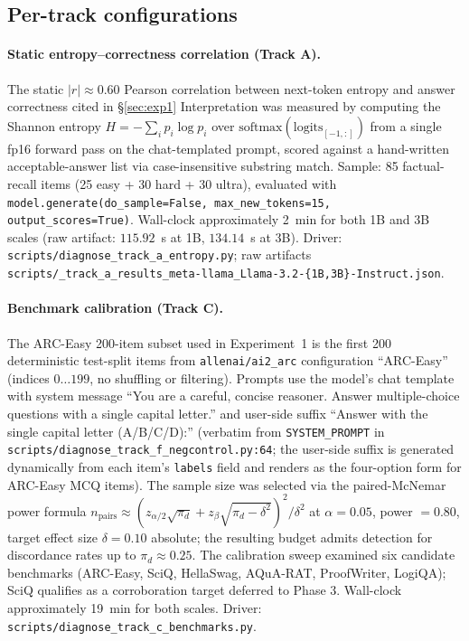 \documentclass{article}
\begin{document}
\subsection{Per-track configurations}

\paragraph{Static entropy--correctness correlation (Track A).}
The static $|r| \approx 0.60$ Pearson correlation between next-token entropy and answer correctness cited in §\ref{sec:exp1} Interpretation was measured by computing the Shannon entropy $H = -\sum_i p_i \log p_i$ over $\mathrm{softmax}(\mathrm{logits}_{[-1, :]})$ from a single fp16 forward pass on the chat-templated prompt, scored against a hand-written acceptable-answer list via case-insensitive substring match. Sample: 85 factual-recall items (25 easy + 30 hard + 30 ultra), evaluated with \texttt{model.generate(do\_sample=False, max\_new\_tokens=15, output\_scores=True)}. Wall-clock approximately 2~min for both 1B and 3B scales (raw artifact: $115.92$~s at 1B, $134.14$~s at 3B). Driver: \texttt{scripts/diagnose\_track\_a\_entropy.py}; raw artifacts \texttt{scripts/\_track\_a\_results\_meta-llama\_Llama-3.2-\{1B,3B\}-Instruct.json}.

\paragraph{Benchmark calibration (Track C).}
The ARC-Easy 200-item subset used in Experiment~1 is the first 200 deterministic test-split items from \texttt{allenai/ai2\_arc} configuration ``ARC-Easy'' (indices $0\ldots199$, no shuffling or filtering). Prompts use the model's chat template with system message ``You are a careful, concise reasoner. Answer multiple-choice questions with a single capital letter.'' and user-side suffix ``Answer with the single capital letter (A/B/C/D):'' (verbatim from \texttt{SYSTEM\_PROMPT} in \texttt{scripts/diagnose\_track\_f\_negcontrol.py:64}; the user-side suffix is generated dynamically from each item's \texttt{labels} field and renders as the four-option form for ARC-Easy MCQ items). The sample size was selected via the paired-McNemar power formula $n_{\text{pairs}} \approx (z_{\alpha/2}\sqrt{\pi_d} + z_\beta \sqrt{\pi_d - \delta^2})^2 / \delta^2$ at $\alpha = 0.05$, power $= 0.80$, target effect size $\delta = 0.10$ absolute; the resulting budget admits detection for discordance rates up to $\pi_d \approx 0.25$. The calibration sweep examined six candidate benchmarks (ARC-Easy, SciQ, HellaSwag, AQuA-RAT, ProofWriter, LogiQA); SciQ qualifies as a corroboration target deferred to Phase 3. Wall-clock approximately 19~min for both scales. Driver: \texttt{scripts/diagnose\_track\_c\_benchmarks.py}.
\end{document}
